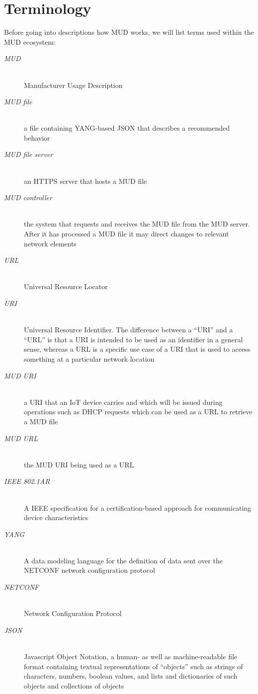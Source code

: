 \documentclass[conference]{IEEEtran}
\begin{document}
\section{Terminology}

Before going into descriptions how MUD works, we will list terms used
within the MUD ecosystem:

\begin{description}
\item[{\color{brown}\it MUD}] \hfill \\ Manufacturer Usage Description
\item[{\color{brown}\it MUD file}] \hfill \\ a file containing YANG-based JSON that
  describes a recommended behavior
\item[{\color{brown}\it MUD file server}] \hfill \\ an HTTPS server that hosts a MUD file
\item[{\color{brown}\it MUD controller}] \hfill \\ the system that requests and
  receives the MUD file from the MUD server.  After it has processed a
  MUD file it may direct changes to relevant network elements
\item[{\color{brown}\it URL}] \hfill \\ Universal Resource Locator
\item[{\color{brown}\it URI}] \hfill \\ Universal Resource
  Identifier.  The difference between a ``URI'' and a ``URL'' is that
  a URI is intended to be used as an identifier in a general sense,
  whereas a URL is a specific use case of a URI that is used to access
  something at a particular network location
\item[{\color{brown}\it MUD URI}] \hfill \\ a URI that an IoT device
  carries and which will be issued during operations such as DHCP
  requests which can be used as a URL to retrieve a MUD file
\item[{\color{brown}\it MUD URL}] \hfill \\ the MUD URI being used as
  a URL
\item[{\color{brown}\it IEEE 802.1AR}] \hfill \\ A IEEE specification for a
  certification-based approach for communicating device
  characteristics
\item[{\color{brown}\it YANG}] \hfill \\ A data modeling language for the
  definition of data sent over the NETCONF network configuration
  protocol\cite{ietf:rfc-yang}
\item[{\color{brown}\it NETCONF}] \hfill \\ Network Configuration
  Protocol\cite{ietf:rfc-netconf}
\item[{\color{brown}\it JSON}] \hfill \\ Javascript Object Notation, a human- as
  well as machine-readable file format containing textual
  representations of ``objects'' such as strings of characters,
  numbers, boolean values, and lists and dictionaries of such objects
  and collections of objects
\end{description}
\end{document}
